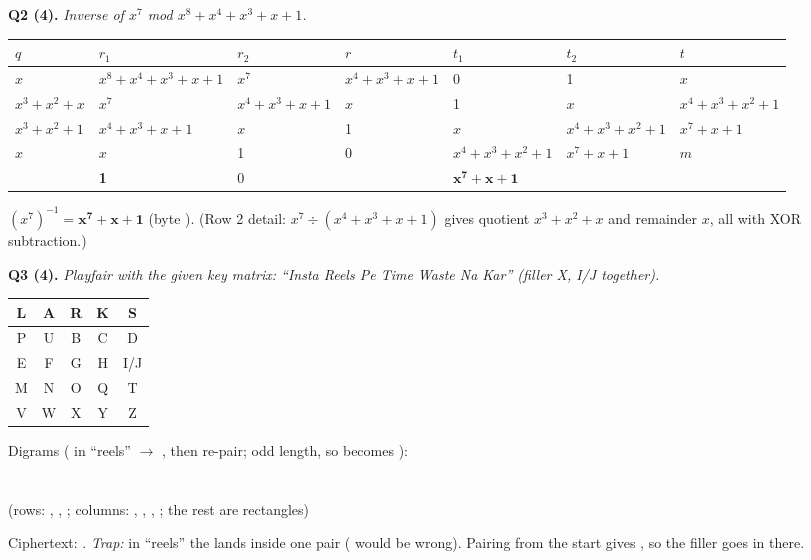 \textbf{Q2 (4).} \emph{Inverse of $x^7$ mod $x^8 + x^4 + x^3 + x + 1$.}
\begin{center}\small\setlength{\tabcolsep}{3pt}
\begin{tabular}{@{}lllllll@{}}
\toprule
$q$ & $r_1$ & $r_2$ & $r$ & $t_1$ & $t_2$ & $t$\\
\midrule
$x$ & $x^8{+}x^4{+}x^3{+}x{+}1$ & $x^7$ & $x^4{+}x^3{+}x{+}1$ & 0 & 1 & $x$\\
$x^3{+}x^2{+}x$ & $x^7$ & $x^4{+}x^3{+}x{+}1$ & $x$ & 1 & $x$ & $x^4{+}x^3{+}x^2{+}1$\\
$x^3{+}x^2{+}1$ & $x^4{+}x^3{+}x{+}1$ & $x$ & 1 & $x$ & $x^4{+}x^3{+}x^2{+}1$ & $x^7{+}x{+}1$\\
$x$ & $x$ & 1 & 0 & $x^4{+}x^3{+}x^2{+}1$ & $x^7{+}x{+}1$ & $m$\\
 & \textbf{1} & 0 & & $\mathbf{x^7{+}x{+}1}$ & & \\
\bottomrule
\end{tabular}
\end{center}
$(x^7)^{-1} = \mathbf{x^7 + x + 1}$ (byte ). (Row 2 detail: $x^7 \div (x^4{+}x^3{+}x{+}1)$ gives quotient $x^3{+}x^2{+}x$ and remainder $x$, all with XOR subtraction.)

\textbf{Q3 (4).} \emph{Playfair with the given key matrix: ``Insta Reels Pe Time Waste Na Kar'' (filler X, I/J together).}
\begin{center}\small
\begin{minipage}[c]{0.25\textwidth}\centering
\begin{tabular}{|*{5}{c|}}\hline L&A&R&K&S\\\hline P&U&B&C&D\\\hline E&F&G&H&I/J\\\hline M&N&O&Q&T\\\hline V&W&X&Y&Z\\\hline\end{tabular}
\end{minipage}
\begin{minipage}[c]{0.7\textwidth}
Digrams ( in ``reels'' $\to$ , then re-pair; odd length, so  becomes ):\\
\\[2pt]
\\[2pt]
(rows: , , ; columns: , , , ; the rest are rectangles)
\end{minipage}
\end{center}
Ciphertext: \textbf{}.
\emph{Trap:} in ``reels'' the  lands inside one pair ( would be wrong). Pairing from the start gives , so the filler goes in there.

